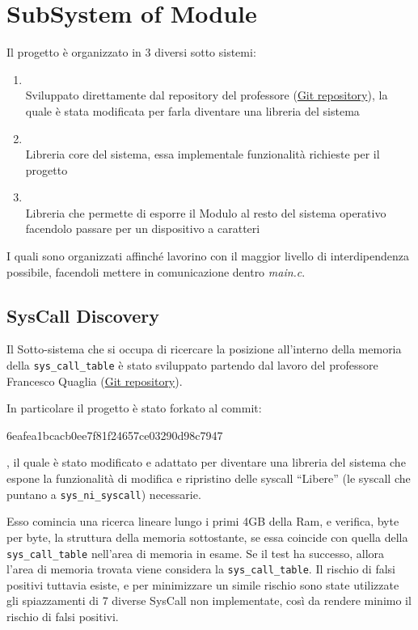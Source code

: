 \section{SubSystem of Module}

Il progetto è organizzato in 3 diversi sotto sistemi:
\begin{enumerate}
\item {} \\
    Sviluppato direttamente dal repository del professore
    (\href{https://github.com/FrancescoQuaglia/Linux-sys_call_table-discoverer}{Git repository}), la quale è stata
    modificata per farla diventare una libreria del sistema
\item {} \\
    Libreria core del sistema, essa implementale funzionalità richieste per il progetto
\item {} \\
    Libreria che permette di esporre il Modulo al resto del sistema operativo facendolo passare per un dispositivo a
    caratteri
\end{enumerate}

I quali sono organizzati affinché lavorino con il maggior livello di interdipendenza possibile, facendoli mettere in
comunicazione dentro \textit{main.c}.

\subsection{SysCall Discovery} \label{SysCallDiscovery}

Il Sotto-sistema che si occupa di ricercare la posizione all'interno della memoria della \verb|sys_call_table| è stato
sviluppato partendo dal lavoro del professore Francesco Quaglia
(\href{https://github.com/FrancescoQuaglia/Linux-sys_call_table-discoverer}{Git repository}).

In particolare il progetto è stato forkato al commit:
\begin{verb}6eafea1bcacb0ee7f81f24657ce03290d98c7947\end{verb}, il quale è stato modificato e
adattato per diventare una libreria del sistema che espone la funzionalità di modifica e ripristino delle syscall
``Libere'' (le syscall che puntano a \verb|sys_ni_syscall|) necessarie.

Esso comincia una ricerca lineare lungo i primi 4GB della Ram, e verifica, byte per byte, la struttura della memoria
sottostante, se essa coincide con quella della \verb|sys_call_table| nell'area di memoria in esame.
Se il test ha successo, allora l'area di memoria trovata viene considera la \verb|sys_call_table|.
Il rischio di falsi positivi tuttavia esiste, e per minimizzare un simile rischio sono state utilizzate gli
spiazzamenti di 7 diverse SysCall non implementate, così da rendere minimo il rischio di falsi positivi.

